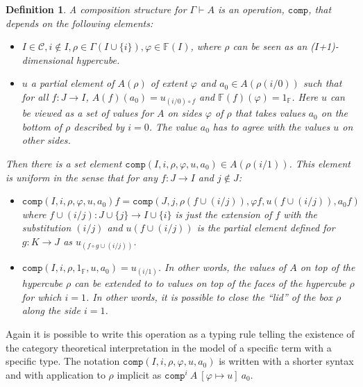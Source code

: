 \documentclass[12pt,a4paper,twoside,xetex]{book}
\newcommand{\keyword}[1]{\emph{#1}\index{#1}}
\newtheorem{definition}[theorem]{Definition}
\newcommand{\op}[1]{\mathtt{#1}}
\newcommand{\compt}[5]{\op{comp}^{#1} \ {#2} \ \left[{#3} \mapsto {#4} \right] \ {#5}}
\begin{document}
\begin{definition}\label{compdef}
A \keyword{composition structure} for $\Gamma \vdash A$ is an operation, 
$\op{comp}$, that depends on the following elements:

\begin{itemize}
\item $I \in \mathcal{C}, i \not \in I, \rho \in \Gamma(I \cup \{i\}), \varphi 
\in \mathbb{F}(I)$, where $\rho$ can be seen as an ($I$+1)-dimensional 
hypercube.
\item $u$ a partial element of $A(\rho)$ of extent $\varphi$ and $a_0 \in 
A(\rho (i/0))$ such that for all $f:J\rightarrow I$, $A(f)(a_0) = u _{(i/0) 
\circ f}$ and $\mathbb{F}(f)(\varphi) = 1_{\mathbb{F}}$. Here $u$ can be viewed 
as a set of values for $A$ on sides $\varphi$ of $\rho$ that takes values $a_0$ 
on the bottom of $\rho$ described by $i=0$. The value $a_0$ has to agree with 
the values $u$ on other sides.
\end{itemize}

Then there is a set element $\op{comp}(I,i,\rho,\varphi, u,a_0)\in 
A(\rho(i/1))$. This element is uniform in the sense that for any $f:J 
\rightarrow I$ and $j \not \in J$: 

\begin{itemize}
\item $\op{comp} \left(I,i,\rho,\varphi, u , a_0 \right) f = 
\op{comp}(J,j,\rho(f \cup (i/j)), \varphi f, u(f \cup (i/j)), a_0 f)$  where $f 
\cup (i/j): J \cup \{j\} \rightarrow I \cup \{i\}$ is just the extension of $f$ 
with the substitution $(i/j)$ and $u(f \cup (i/j))$ is the partial element 
defined for $g: K \rightarrow J$ as $u_{(f \circ g \cup (i/j))}$.

\item $\op{comp}(I,i,\rho, 1_{\mathbb{F}}, u, a_0) = u_{(i/1)}$. In other 
words, the values of $A$ on top of the hypercube $\rho$ can be extended to to 
values on top of the faces of the hypercube $\rho$ for which $i=1$. In other 
words, it is possible to close the ``lid'' of the box $\rho$ along the side 
$i=1$.

\end{itemize}



\end{definition}



Again it is possible to write this operation as a typing rule telling the 
existence of the category theoretical interpretation in the model of a specific 
term with a specific type. The notation $\op{comp}(I,i,\rho, \varphi, u, a_0)$ 
is written with a shorter syntax and with application to $\rho$ implicit as 
$\compt{i}{A}{\varphi}{u}{a_0}$.
\end{document}
